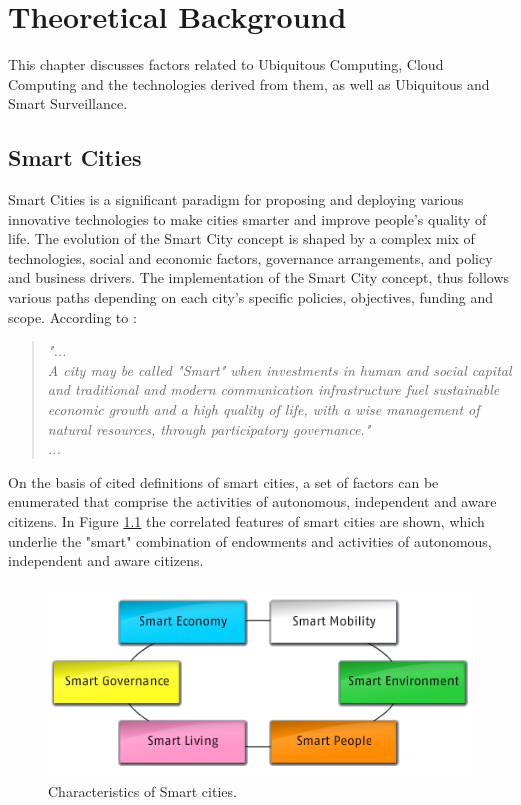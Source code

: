 \chapter{Theoretical Background}

This chapter discusses factors related to Ubiquitous Computing, Cloud Computing and the technologies derived from them, as well as Ubiquitous and Smart Surveillance.

\section{Smart Cities}
Smart Cities is a significant paradigm for proposing and deploying various innovative technologies to make cities smarter and improve people's quality of life\cite{Pribyl2015}. The evolution of the Smart City concept is shaped by a complex mix of technologies, social and economic factors, governance arrangements, and policy and business drivers. The implementation of the Smart City concept, thus follows various paths depending on each city's specific policies, objectives, funding and scope. 
According to \cite{Schaffers2011}:

\begin{quotation}
\textit{"...\\A city may be called "Smart" when investments in human and social capital and traditional and modern communication infrastructure fuel sustainable economic growth and a high quality of life, with a wise management of natural resources, through participatory governance."\\...}
\end{quotation}

On the basis of cited definitions of smart cities, a set of factors can be enumerated that comprise the activities of autonomous, independent and aware citizens. In Figure \ref{fig:smart} the correlated features of smart cities are shown, which underlie the "smart" combination of endowments and activities of autonomous, independent and aware citizens.


\begin{figure}[htb!]
  \centering
    \includegraphics[scale=0.99]{Imagens/cap2_smarcite.png}
    \caption{Characteristics of Smart cities.}
    \label{fig:smart}
\end{figure}


